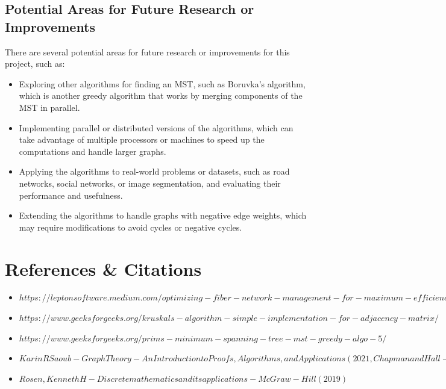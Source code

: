 \documentclass[a4paper, 10pt, twocolumn]{article}
\begin{document}
\subsection{Potential Areas for Future Research or Improvements}
There are several potential areas for future research or improvements for this project, such as:
    \begin{itemize}
        \item Exploring other algorithms for finding an MST, such as Boruvka’s algorithm, which is another greedy algorithm that works by merging components of the MST in parallel.
        \item Implementing parallel or distributed versions of the algorithms, which can take advantage of multiple processors or machines to speed up the computations and handle larger graphs.
        \item Applying the algorithms to real-world problems or datasets, such as road networks, social networks, or image segmentation, and evaluating their performance and usefulness.
        \item Extending the algorithms to handle graphs with negative edge weights, which may require modifications to avoid cycles or negative cycles.
    \end{itemize}
\newpage
\onecolumn
\section{References \& Citations}
\begin{itemize}
    \item \href{https://leptonsoftware.medium.com/optimizing-fiber-network-management-for-maximum-efficiency-444927851a28}{$https://leptonsoftware.medium.com/optimizing-fiber-network-management-for-maximum-efficiency-444927851a28$}
    \item \href{https://www.geeksforgeeks.org/kruskals-algorithm-simple-implementation-for-adjacency-matrix/}{$https://www.geeksforgeeks.org/kruskals-algorithm-simple-implementation-for-adjacency-matrix/$}
    \item \href{https://www.geeksforgeeks.org/prims-minimum-spanning-tree-mst-greedy-algo-5/}{$https://www.geeksforgeeks.org/prims-minimum-spanning-tree-mst-greedy-algo-5/$}
    \item \href{Karin R Saoub - Graph Theory_ An Introduction to Proofs, Algorithms, and Applications (2021, Chapman and Hall_CRC)}{$Karin R Saoub-Graph Theory-An Introduction to Proofs, Algorithms, and Applications (2021, Chapman and Hall-CRC)$}
    \item \href{Rosen, Kenneth H - Discrete mathematics and its applications-McGraw-Hill (2019)}{$Rosen, Kenneth H - Discrete mathematics and its applications-McGraw-Hill (2019)$}
\end{itemize}
\end{document}
